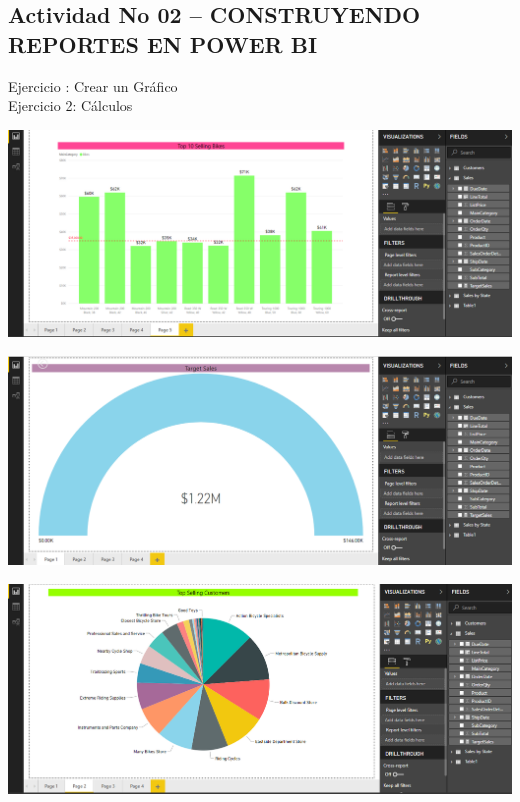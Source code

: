 
\subsection{Actividad No 02 – CONSTRUYENDO REPORTES EN POWER BI}
Ejercicio :  Crear un Gráfico \\
Ejercicio 2: Cálculos \\

	\begin{center}
	\includegraphics[width=18cm]{./Imagenes/EJER2T1(1)}
	\end{center}	

	\begin{center}
	\includegraphics[width=18cm]{./Imagenes/EJER2T1(2)}
	\end{center}	

	\begin{center}
	\includegraphics[width=18cm]{./Imagenes/EJER2T1(3)}
	\end{center}	

